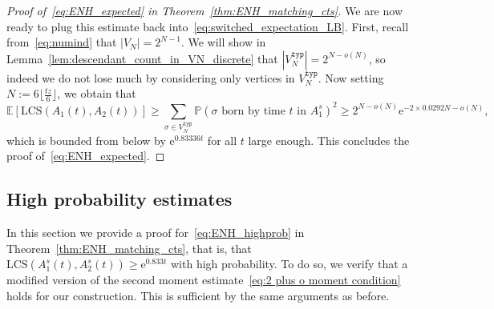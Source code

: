 \documentclass[11pt]{article}
\numberwithin{equation}{section}
\newcommand{\p}{\mathbb{P}} %
\newcommand{\E}{\mathbb{E}} %
\newcommand{\MCST}{\mathrm{LCS}} %
\newcommand{\LCS}{\mathrm{LCS}} %
\newcommand{\e}{\mathrm e}
\theoremstyle{definition}
\begin{document}
\begin{proof}[Proof of~\eqref{eq:ENH_expected} in Theorem~\ref{thm:ENH_matching_cts}]
We are now ready to plug this estimate back into~\eqref{eq:switched_expectation_LB}. 
First, recall from~\eqref{eq:numind} that $|V_{N}|=2^{N-1}$. 
We will show in Lemma~\ref{lem:descendant_count_in_VN_discrete} that 
$|V_N^{\mathtt{typ}}|=2^{N-o(N)}$, 
so indeed we do not lose much by considering only vertices in 
$V_N^{\mathtt{typ}}$. 
Now setting $N := 6 \lfloor \tfrac{tz}{6} \rfloor$, 
we obtain that 
\begin{equation*}
\E \left[ \LCS(A_{1}(t), A_{2}(t)) \right] 
\geq \sum_{\sigma \in V_N^{\mathtt{typ}}} \p \left( \sigma \text{ born by time } t \text{ in } A_{1}^{s} \right)^{2} 
\geq 2^{N-o(N)} \e^{ - 2 \times 0.0292  N - o(N)},
\end{equation*}
which is bounded from below by $\e^{0.83336 t}$ 
for all $t$ large enough. This concludes the proof of~\eqref{eq:ENH_expected}. 
\end{proof}



\subsection{High probability estimates}\label{subsec:High probab}


In this section we provide a proof for~\eqref{eq:ENH_highprob} in Theorem~\ref{thm:ENH_matching_cts}, that is, that $\MCST\left( A^s_1(t), A^s_2(t) \right) \geq \e^{0.833 t}$ with high probability. To do so, we verify that a modified version of the second moment estimate~\eqref{eq:2 plus o moment condition} holds for our construction. This is sufficient by the same arguments as before. 
\end{document}
